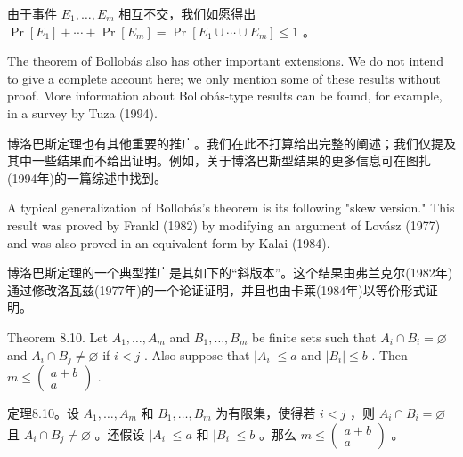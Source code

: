 \documentclass[10pt]{article}
\begin{document}
\begin{tcolorbox}\relax
由于事件 \({E}_{1},\ldots ,{E}_{m}\) 相互不交，我们如愿得出 \(\Pr \left\lbrack  {E}_{1}\right\rbrack   + \cdots  + \Pr \left\lbrack  {E}_{m}\right\rbrack   = \Pr \left\lbrack  {{E}_{1} \cup  \cdots  \cup  {E}_{m}}\right\rbrack   \leq  1\) 。
\end{tcolorbox}

The theorem of Bollobás also has other important extensions. We do not intend to give a complete account here; we only mention some of these results without proof. More information about Bollobás-type results can be found, for example, in a survey by Tuza (1994).

\begin{tcolorbox}\relax
博洛巴斯定理也有其他重要的推广。我们在此不打算给出完整的阐述；我们仅提及其中一些结果而不给出证明。例如，关于博洛巴斯型结果的更多信息可在图扎(1994年)的一篇综述中找到。
\end{tcolorbox}

A typical generalization of Bollobás's theorem is its following "skew version." This result was proved by Frankl (1982) by modifying an argument of Lovász (1977) and was also proved in an equivalent form by Kalai (1984).

\begin{tcolorbox}\relax
博洛巴斯定理的一个典型推广是其如下的“斜版本”。这个结果由弗兰克尔(1982年)通过修改洛瓦兹(1977年)的一个论证证明，并且也由卡莱(1984年)以等价形式证明。
\end{tcolorbox}

Theorem 8.10. Let \({A}_{1},\ldots ,{A}_{m}\) and \({B}_{1},\ldots ,{B}_{m}\) be finite sets such that \({A}_{i} \cap  {B}_{i} = \varnothing\) and \({A}_{i} \cap  {B}_{j} \neq  \varnothing\) if \(i < j\) . Also suppose that \(\left| {A}_{i}\right|  \leq  a\) and \(\left| {B}_{i}\right|  \leq  b\) . Then \(m \leq  \left( \begin{matrix} a + b \\  a \end{matrix}\right)\) .

\begin{tcolorbox}\relax
定理8.10。设 \({A}_{1},\ldots ,{A}_{m}\) 和 \({B}_{1},\ldots ,{B}_{m}\) 为有限集，使得若 \(i < j\) ，则 \({A}_{i} \cap  {B}_{i} = \varnothing\) 且 \({A}_{i} \cap  {B}_{j} \neq  \varnothing\) 。还假设 \(\left| {A}_{i}\right|  \leq  a\) 和 \(\left| {B}_{i}\right|  \leq  b\) 。那么 \(m \leq  \left( \begin{matrix} a + b \\  a \end{matrix}\right)\) 。
\end{tcolorbox}
\end{document}
